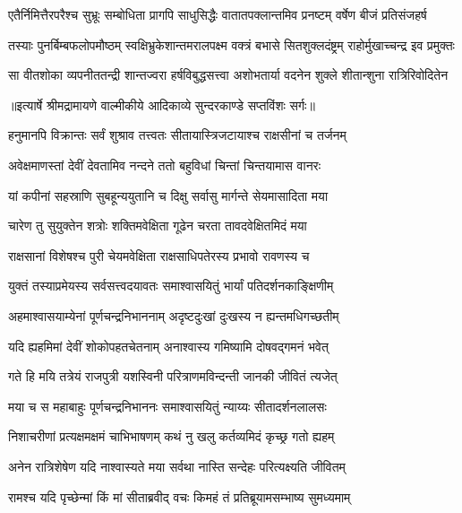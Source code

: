 \fourlineindentedshloka
{एतैर्निमित्तैरपरैश्च सुभ्रूः}
{सम्बोधिता प्रागपि साधुसिद्धैः}
{वातातपक्लान्तमिव प्रनष्टम्}
{वर्षेण बीजं प्रतिसंजहर्ष} %

\fourlineindentedshloka
{तस्याः पुनर्बिम्बफलोपमौष्ठम्}
{स्वक्षिभ्रुकेशान्तमरालपक्ष्म}
{वक्त्रं बभासे सितशुक्लदंष्ट्रम्}
{राहोर्मुखाच्चन्द्र इव प्रमुक्तः} %

\fourlineindentedshloka
{सा वीतशोका व्यपनीततन्द्री}
{शान्तज्वरा हर्षविबुद्धसत्त्वा}
{अशोभतार्या वदनेन शुक्ले}
{शीतान्शुना रात्रिरिवोदितेन} %


{॥इत्यार्षे श्रीमद्रामायणे वाल्मीकीये आदिकाव्ये सुन्दरकाण्डे सप्तविंशः सर्गः॥}


\twolineshloka
{हनुमानपि विक्रान्तः सर्वं शुश्राव तत्त्वतः}
{सीतायास्त्रिजटायाश्च राक्षसीनां च तर्जनम्} %

\twolineshloka
{अवेक्षमाणस्तां देवीं देवतामिव नन्दने}
{ततो बहुविधां चिन्तां चिन्तयामास वानरः} %

\twolineshloka
{यां कपीनां सहस्राणि सुबहून्ययुतानि च}
{दिक्षु सर्वासु मार्गन्ते सेयमासादिता मया} %

\twolineshloka
{चारेण तु सुयुक्तेन शत्रोः शक्तिमवेक्षिता}
{गूढेन चरता तावदवेक्षितमिदं मया} %

\twolineshloka
{राक्षसानां विशेषश्च पुरी चेयमवेक्षिता}
{राक्षसाधिपतेरस्य प्रभावो रावणस्य च} %

\twolineshloka
{युक्तं तस्याप्रमेयस्य सर्वसत्त्वदयावतः}
{समाश्वासयितुं भार्यां पतिदर्शनकाङ्क्षिणीम्} %

\twolineshloka
{अहमाश्वासयाम्येनां पूर्णचन्द्रनिभाननाम्}
{अदृष्टदुःखां दुःखस्य न ह्यन्तमधिगच्छतीम्} %

\twolineshloka
{यदि ह्यहमिमां देवीं शोकोपहतचेतनाम्}
{अनाश्वास्य गमिष्यामि दोषवद्गमनं भवेत्} %

\twolineshloka
{गते हि मयि तत्रेयं राजपुत्री यशस्विनी}
{परित्राणमविन्दन्ती जानकी जीवितं त्यजेत्} %

\twolineshloka
{मया च स महाबाहुः पूर्णचन्द्रनिभाननः}
{समाश्वासयितुं न्याय्यः सीतादर्शनलालसः} %

\twolineshloka
{निशाचरीणां प्रत्यक्षमक्षमं चाभिभाषणम्}
{कथं नु खलु कर्तव्यमिदं कृच्छ्र गतो ह्यहम्} %

\twolineshloka
{अनेन रात्रिशेषेण यदि नाश्वास्यते मया}
{सर्वथा नास्ति सन्देहः परित्यक्ष्यति जीवितम्} %

\twolineshloka
{रामश्च यदि पृच्छेन्मां किं मां सीताब्रवीद् वचः}
{किमहं तं प्रतिब्रूयामसम्भाष्य सुमध्यमाम्} %

